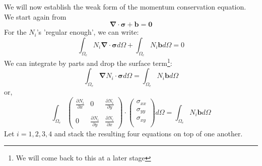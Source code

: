 We will now establish the weak form of the momentum conservation equation. 
We start again from 
\[
{\bm \nabla}\cdot {\bm \sigma} + {\bm b} = {\bm 0} 
\]
For the $N_i$'s 'regular enough', we can write:
\[
\int_{\Omega_e} N_i {\bm \nabla}\cdot {\bm \sigma} d\Omega + \int_{\Omega_e} N_i  {\bm b} d\Omega =0
\]
We can integrate by parts and drop the surface term\footnote{We will come back to this at a later stage}:
\[
\int_{\Omega_e} {\bm \nabla } N_i \cdot {\bm \sigma} d\Omega = \int_{\Omega_e} N_i  {\bm b} d\Omega 
\]
or, 
\[
\int_{\Omega_e} 
\left(
\begin{array}{ccc}
\frac{\partial N_i}{\partial x} & 0 & \frac{\partial N_i}{\partial y} \\  \\
0 & \frac{\partial N_i}{\partial y} &  \frac{\partial N_i}{\partial x}  
\end{array}
\right)
\cdot
\left(
\begin{array}{c}
\sigma_{xx}\\
\sigma_{yy}\\
\sigma_{xy}\\
\end{array}
\right)
d\Omega = \int_{\Omega_e} N_i {\bm b} d\Omega 
\]
Let $i=1,2,3,4$ and stack the resulting four equations on top of one another. 
